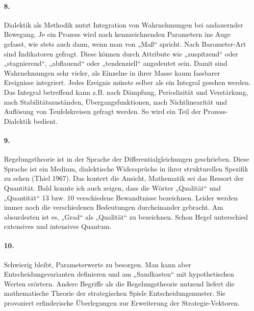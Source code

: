 \documentclass[a4paper,11pt]{article}
\begin{document}
\paragraph{8.}
Dialektik als Methodik nutzt Integration von Wahrnehmungen bei andauernder
Bewegung. Je ein Prozess wird nach kennzeichnenden Parametern ins Auge
gefasst, wie stets auch dann, wenn man von „Maß“ spricht. Nach Barometer-Art
sind Indikatoren gefragt. Diese können durch Attribute wie „zuspitzend“ oder
„stagnierend“, „abflauend“ oder „tendenziell“ angedeutet sein.  Damit sind
Wahrnehmungen sehr vieler, als Einzelne in ihrer Masse kaum fassbarer
Ereignisse integriert. Jedes Ereignis müsste selber als ein Integral gesehen
werden. Das Integral betreffend kann z.B. nach Dämpfung, Periodizität und
Verstärkung, nach Stabilitätszuständen, Übergangsfunktionen, nach
Nichtlinearität und Auflösung von Teufelskreisen gefragt werden. So wird ein
Teil der Prozess-Dialektik bedient.

\paragraph{9.}
Regelungstheorie ist in der Sprache der Differentialgleichungen geschrieben.
Diese Sprache ist ein Medium, dialektische Widersprüche in ihrer strukturellen
Spezifik zu sehen (Thiel 1967). Das kontert die Ansicht, Mathematik sei das
Ressort der Quantität. Bald konnte ich auch zeigen, dass die Wörter „Qualität“
und „Quantität“ 13 bzw. 10 verschiedene Bewandtnisse bezeichnen. Leider werden
immer noch die verschiedenen Bedeutungen durcheinander gebracht. Am
absurdesten ist es, „Grad“ als „Qualität“ zu bezeichnen. Schon Hegel
unterschied extensives und intensives Quantum.

\paragraph{10.}
Schwierig bleibt, Parameterwerte zu besorgen. Man kann aber
Entscheidungsvarianten definieren und am „Sandkasten“ mit hypothetischen
Werten erörtern. Andere Begriffe als die Regelungstheorie nutzend liefert die
mathematische Theorie der strategischen Spiele Entscheidungsmuster. Sie
provoziert erfinderische Überlegungen zur Erweiterung der Strategie-Vektoren.
\end{document}
